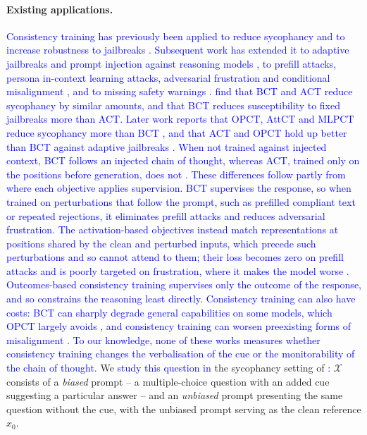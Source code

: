 \documentclass{article}
\begin{document}
\paragraph{Existing applications.}
\textcolor{blue}{Consistency training has previously been applied to reduce sycophancy \citep{chua_bias-augmented_2024,han2026onpolicy} and to increase robustness to jailbreaks \citep{irpan_consistency_2025,han2026onpolicy}.} \textcolor{blue}{Subsequent work has extended it to adaptive jailbreaks and prompt injection against reasoning models \citep{shah2026adaptive}, to prefill attacks, persona in-context learning attacks, adversarial frustration and conditional misalignment \citep{gautam2026consistency}, and to missing safety warnings \citep{han2026onpolicy}.} \textcolor{blue}{\citet{irpan_consistency_2025} find that BCT and ACT reduce sycophancy by similar amounts, and that BCT reduces susceptibility to fixed jailbreaks more than ACT.} \textcolor{blue}{Later work reports that OPCT, AttCT and MLPCT reduce sycophancy more than BCT \citep{han2026onpolicy,gautam2026consistency}, and that ACT and OPCT hold up better than BCT against adaptive jailbreaks \citep{shah2026adaptive,han2026onpolicy}.} \textcolor{blue}{When not trained against injected context, BCT follows an injected chain of thought, whereas ACT, trained only on the positions before generation, does not \citep{shah2026adaptive}.} \textcolor{blue}{These differences follow partly from where each objective applies supervision.} \textcolor{blue}{BCT supervises the response, so when trained on perturbations that follow the prompt, such as prefilled compliant text or repeated rejections, it eliminates prefill attacks and reduces adversarial frustration.} \textcolor{blue}{The activation-based objectives instead match representations at positions shared by the clean and perturbed inputs, which precede such perturbations and so cannot attend to them; their loss becomes zero on prefill attacks and is poorly targeted on frustration, where it makes the model worse \citep{gautam2026consistency}.} \textcolor{blue}{Outcomes-based consistency training supervises only the outcome of the response, and so constrains the reasoning least directly.} \textcolor{blue}{Consistency training can also have costs: BCT can sharply degrade general capabilities on some models, which OPCT largely avoids \citep{han2026onpolicy}, and consistency training can worsen preexisting forms of misalignment \citep{africa2026consistency}.} \textcolor{blue}{To our knowledge, none of these works measures whether consistency training changes the verbalisation of the cue or the monitorability of the chain of thought.} We \textcolor{blue}{study this question in} the sycophancy setting of \textcolor{blue}{\citet{chua_bias-augmented_2024}:} $\mathcal{X}$ consists of a \emph{biased} prompt -- a multiple-choice question with an added cue suggesting a particular answer -- and an \emph{unbiased} prompt presenting the same question without the cue, with the unbiased prompt serving as the clean reference $x_0$.
\end{document}
